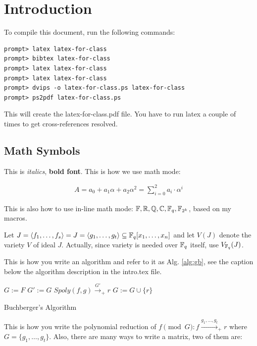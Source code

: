 \section{Introduction}

To compile this document, run the following commands: 

\begin{verbatim}
prompt> latex latex-for-class
prompt> bibtex latex-for-class
prompt> latex latex-for-class
prompt> latex latex-for-class
prompt> dvips -o latex-for-class.ps latex-for-class
prompt> ps2pdf latex-for-class.ps
\end{verbatim}

This will create the latex-for-class.pdf file. You have to run latex a
couple of times to get cross-references resolved. 

\subsection{Math Symbols}

This is {\it italics}, {\bf bold font}. This is how we use math mode:

\begin{align}
A = a_0 + a_1 \alpha + a_2 \alpha^2 = \sum _{i=0}^{2} a_i \cdot \alpha^i
\end{align}

This is also how to use in-line math mode: ${\mathbb{F}}, {\mathbb{R}}, {\mathbb{Q}}, {\mathbb{C}}, {\mathbb{F}}_{q},
{\mathbb{F}}_{2^k}$, based on my macros.

Let $ {J = \langle f_1, \dots, f_s\rangle} = {J = \langle g_1, \dots, g_t\rangle} \subseteq {\mathbb{F}}_{q}[x_1, \dots, x_n]$ and let $V(J)$
denote the variety $V$ of ideal $J$. Actually, since variety is needed
over ${\mathbb{F}}_{q}$ itself, use ${V_{{\mathbb{F}}_{q}}(J)}$.

This is how you write an algorithm and refer to it as
Alg. \ref{alg:gb}, see the caption below the algorithm description in
the intro.tex file.

\begin{algorithm}[hbt]
\SetAlgoNoLine
  $G:= F$\;
  {
  	$G' := G$\;
	{
		$Spoly(f, g) \stackrel{G'}{\textstyle\longrightarrow}_+r$ \;
		{
			$G:= G \cup \{r\}$ \;
		}
	}
   }
\caption {Buchberger's Algorithm}
\label{alg:gb}
\end{algorithm}

This is how you write the polynomial reduction of $f \pmod{ G}: f
\xrightarrow{g_1, \dots, g_t} _+ r$ where $G = \{g_1, \dots,
g_t\}$. Also, there are many ways to write a matrix, two of them are: 


